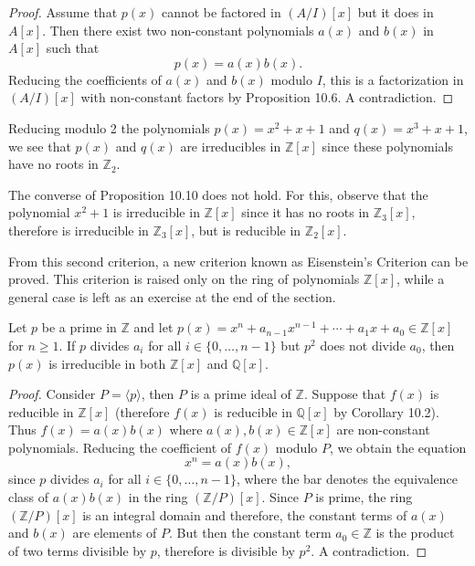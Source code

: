 \documentclass[11pt,a4paper]{article}
\begin{document}
    \begin{proof}
    Assume that $p(x)$ cannot be factored in $(A/I)[x]$ but it does in $A[x]$. Then there exist two non-constant polynomials $a(x)$ and $b(x)$ in $A[x]$ such that
    \[
    p(x) = a(x)b(x).
    \]
    Reducing the coefficients of $a(x)$ and $b(x)$ modulo $I$, this is a factorization in $(A/I)[x]$ with non-constant factors by Proposition 10.6. A contradiction.
    \end{proof}
    
    \begin{exa}[10.12]
    Reducing modulo 2 the polynomials $p(x) = x^2 + x + 1$ and $q(x) = x^3 + x + 1$, we see that $p(x)$ and $q(x)$ are irreducibles in $\mathbb{Z}[x]$ since these polynomials have no roots in $\mathbb{Z}_2$.
    \end{exa}
    
    \begin{exa}[10.13]
    The converse of Proposition 10.10 does not hold. For this, observe that the polynomial $x^2 + 1$ is irreducible in $\mathbb{Z}[x]$ since it has no roots in $\mathbb{Z}_3[x]$, therefore is irreducible in $\mathbb{Z}_3[x]$, but is reducible in $\mathbb{Z}_2[x]$.
    \end{exa}
    
    From this second criterion, a new criterion known as Eisenstein's Criterion can be proved. This criterion is raised only on the ring of polynomials $\mathbb{Z}[x]$, while a general case is left as an exercise at the end of the section.
    
    \begin{prop}
    Let $p$ be a prime in $\mathbb{Z}$ and let $p(x) = x^n + a_{n-1}x^{n-1} + \cdots + a_1x + a_0 \in \mathbb{Z}[x]$ for $n \geq 1$. If $p$ divides $a_i$ for all $i \in \{0, \ldots, n-1\}$ but $p^2$ does not divide $a_0$, then $p(x)$ is irreducible in both $\mathbb{Z}[x]$ and $\mathbb{Q}[x]$.
    \end{prop}
    
    \begin{proof}
    Consider $P = \langle p \rangle$, then $P$ is a prime ideal of $\mathbb{Z}$. Suppose that $f(x)$ is reducible in $\mathbb{Z}[x]$ (therefore $f(x)$ is reducible in $\mathbb{Q}[x]$ by Corollary 10.2). Thus $f(x) = a(x)b(x)$ where $a(x), b(x) \in \mathbb{Z}[x]$ are non-constant polynomials. Reducing the coefficient of $f(x)$ modulo $P$, we obtain the equation
    \[
    x^n = a(x)b(x),
    \]
    since $p$ divides $a_i$ for all $i \in \{0, \ldots, n-1\}$, where the bar denotes the equivalence class of $a(x)b(x)$ in the ring $(\mathbb{Z}/P)[x]$. Since $P$ is prime, the ring $(\mathbb{Z}/P)[x]$ is an integral domain and therefore, the constant terms of $a(x)$ and $b(x)$ are elements of $P$. But then the constant term $a_0 \in \mathbb{Z}$ is the product of two terms divisible by $p$, therefore is divisible by $p^2$. A contradiction.
    \end{proof}

\vfill{}
\end{document}
